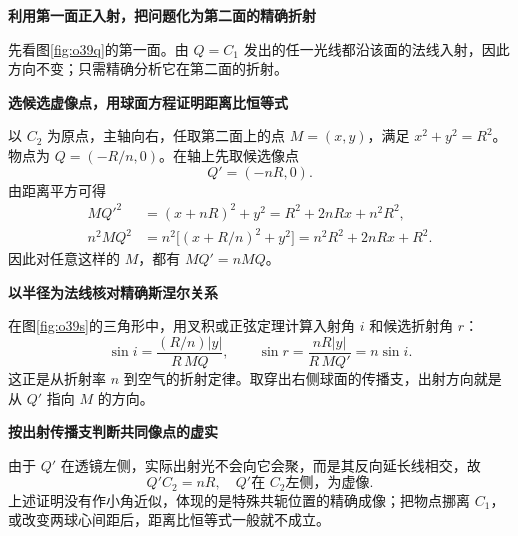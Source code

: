 \begin{solution}\textbf{利用第一面正入射，把问题化为第二面的精确折射}\par\nobreak
先看图\ref{fig:o39q}的第一面。由 \(Q=C_1\) 发出的任一光线都沿该面的法线入射，因此方向不变；只需精确分析它在第二面的折射。



\par\medskip{}\noindent\textbf{选候选虚像点，用球面方程证明距离比恒等式}\par\nobreak
以 \(C_2\) 为原点，主轴向右，任取第二面上的点 \(M=(x,y)\)，满足 \(x^2+y^2=R^2\)。物点为 \(Q=(-R/n,0)\)。在轴上先取候选像点
\[
 Q'=(-nR,0).
\]
由距离平方可得
\begin{align*}
 MQ'^2&=(x+nR)^2+y^2
       =R^2+2nRx+n^2R^2,\\
 n^2MQ^2&=n^2\bigl[(x+R/n)^2+y^2\bigr]
       =n^2R^2+2nRx+R^2.
\end{align*}
因此对任意这样的 \(M\)，都有 \(MQ'=nMQ\)。



\par\medskip{}\noindent\textbf{以半径为法线核对精确斯涅尔关系}\par\nobreak
在图\ref{fig:o39s}的三角形中，用叉积或正弦定理计算入射角 \(i\) 和候选折射角 \(r\)：
\[
 \sin i=\frac{(R/n)|y|}{R\,MQ},\qquad
 \sin r=\frac{nR|y|}{R\,MQ'}=n\sin i.
\]
这正是从折射率 \(n\) 到空气的折射定律。取穿出右侧球面的传播支，出射方向就是从 \(Q'\) 指向 \(M\) 的方向。



\par\medskip{}\noindent\textbf{按出射传播支判断共同像点的虚实}\par\nobreak
由于 \(Q'\) 在透镜左侧，实际出射光不会向它会聚，而是其反向延长线相交，故
\[
 \boxed{Q'C_2=nR,\quad Q'\text{在 }C_2\text{左侧，为虚像}}.
\]
上述证明没有作小角近似，体现的是特殊共轭位置的精确成像；把物点挪离 \(C_1\)，或改变两球心间距后，距离比恒等式一般就不成立。
\end{solution}

